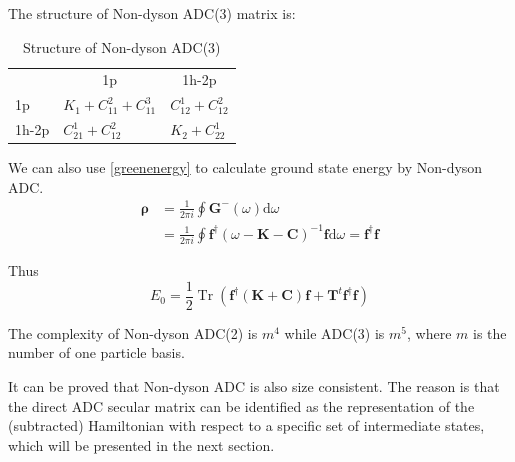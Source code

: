 The structure of Non-dyson ADC(3) matrix is:
\begin{table}
	\centering
	\caption{Structure of Non-dyson ADC(3)}
	\label{ADC3}
	\begin{tabular}{ccc}
						           &                     1p                       &                     1h-2p                \\ \cline{2-3} 
		\multicolumn{1}{l|}{1p   } & \multicolumn{1}{l|}{$K_1+C^2_{11}+C^3_{11}$} & \multicolumn{1}{l|}{$C^1_{12}+C^2_{12}$} \\ \cline{2-3} 
		\multicolumn{1}{l|}{1h-2p} & \multicolumn{1}{l|}{$C^1_{21}+C^2_{12}$}     & \multicolumn{1}{l|}{$K_2+C^1_{22}$}      \\ \cline{2-3} 
	\end{tabular}
\end{table}

We can also use \ref{greenenergy} to calculate ground state energy by Non-dyson ADC.
\begin{equation}
	\begin{aligned}
		\boldsymbol{\rho}&=\frac{1}{2 \pi i} \oint \boldsymbol{G}^{-}(\omega) \mathrm{d} \omega
		\\
		&=\frac{1}{2 \pi i} \oint \boldsymbol{f}^{\dagger}(\omega-\boldsymbol{K}-\boldsymbol{C})^{-1} \boldsymbol{f} \mathrm{d} \omega=\boldsymbol{f}^{\dagger} \boldsymbol{f}
	\end{aligned}
\end{equation}

Thus
\begin{equation}
	E_{0}=\frac{1}{2} \operatorname{Tr}\left(\boldsymbol{f}^{\dagger}(\boldsymbol{K}+\boldsymbol{C}) \boldsymbol{f}+\boldsymbol{T}^{t} \boldsymbol{f}^{\dagger} \boldsymbol{f}\right)
\end{equation}

The complexity of Non-dyson ADC(2) is $m^4$ while ADC(3) is $m^5$, where $m$ is the number of one particle basis.

It can be proved that Non-dyson ADC is also size consistent.
The reason is that the direct ADC secular matrix can be identified as the representation of the (subtracted) Hamiltonian with respect to a specific set of intermediate states, which will be presented in the next section.

